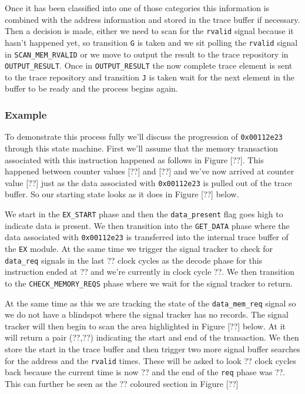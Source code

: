 Once it has been classified into one of those categories this information is combined with the address information and stored in the trace buffer if necessary. Then a decision is made, either we need to scan for the \texttt{rvalid} signal because it hasn't happened yet, so transition \texttt{G} is taken and we sit polling the \texttt{rvalid} signal in \texttt{SCAN\_MEM\_RVALID} or we move to output the result to the trace repository in \texttt{OUTPUT\_RESULT}. Once in \texttt{OUTPUT\_RESULT} the now complete trace element is sent to the trace repository and transition \texttt{J} is taken wait for the next element in the buffer to be ready and the process begins again.

\subsubsection{Example}

To demonstrate this process fully we'll discuss the progression of \texttt{0x00112e23} through this state machine. First we'll assume that the memory transaction associated with this instruction happened as follows in Figure [??]. This happened between counter values [??] and [??] and we've now arrived at counter value [??] just as the data associated with \texttt{0x00112e23} is pulled out of the trace buffer. So our starting state looks as it does in Figure [??] below.



We start in the \texttt{EX\_START} phase and then the \texttt{data\_present} flag goes high to indicate data is present. We then transition into the \texttt{GET\_DATA} phase where the data associated with \texttt{0x00112e23} is transferred into the internal trace buffer of the \texttt{EX} module. At the same time we trigger the signal tracker to check for \texttt{data\_req} signals in the last ?? clock cycles as the decode phase for this instruction ended at ?? and we're currently in clock cycle ??. We then transition to the \texttt{CHECK\_MEMORY\_REQS} phase where we wait for the signal tracker to return.

At the same time as this we are tracking the state of the \texttt{data\_mem\_req} signal so we do not have a blindspot where the signal tracker has no records. The signal tracker will then begin to scan the area highlighted in Figure [??] below. At it will return a pair (??,??) indicating the start and end of the transaction. We then store the start in the trace buffer and then trigger two more signal buffer searches for the address and the \texttt{rvalid} times. These will be asked to look ?? clock cycles back because the current time is now ?? and the end of the \texttt{req} phase was ??. This can further be seen as the ?? coloured section in Figure [??]

